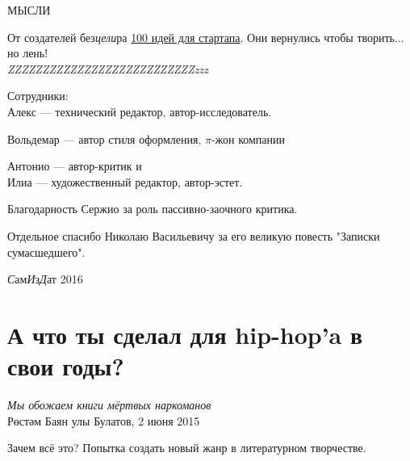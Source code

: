 \documentclass{ideas}
\author{Alive Pine, Inc.}
\begin{document}
\begin{titlepage}

\vspace*{\fill}
\begin{center}
\Huge МЫСЛИ
\end{center}
\vspace*{\fill}
\end{titlepage}

\begin{titlepage}
    От создателей без\emph{цели}ра \href{https://antoniii.github.io/}{100 идей для стартапа}. 
    Они вернулись чтобы творить... но лень!\\

    \emph{\Huge{ZZZ}\LARGE{ZZZ}\Large{ZZZ}\large{ZZZ}ZZZ\small{ZZZ}\footnotesize{ZZZ}\scriptsize{ZZZ}\tiny{ZZZ}\tiny{zzz}}
\end{titlepage}

\begin{center}
\end{center}
\newpage

\begin{center}
Сотрудники:\\
Алекс --- технический редактор, автор-исследователь.\\\vspace{1em}

Вольдемар --- автор стиля оформления, \( \pi\text{-жон} \) компании\\\vspace{1em}

Антонио --- автор-критик и \\Илиа --- художественный редактор, автор-эстет.\\
\end{center}


Благодарность Сержио за роль пассивно-заочного критика. 


Отдельное спасибо Николаю Васильевичу за его великую повесть "Записки сумасшедшего".
\vfill
\begin{center}
\textit{С}ам\textit{И}з\textit{Д}ат 2016
\end{center}
\newpage
\section*{А что ты сделал для hip-hop'a в свои годы?}\label{section:one}
\begin{displayquote}
\begin{flushright}
    \textit{Мы обожаем книги мёртвых наркоманов}\\
    Рөстәм Баян улы Булатов, 2 июня 2015
\end{flushright}
\end{displayquote}
Зачем всё это? Попытка создать новый жанр в литературном творчестве.
\end{document}
